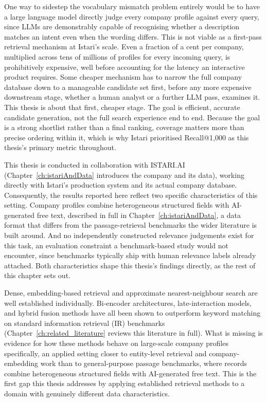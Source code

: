 \documentclass[a4paper,oneside,bibliography=totoc]{scrbook}
\begin{document}
One way to sidestep the vocabulary mismatch problem entirely would be to have a large language model directly judge every company profile against every query, since LLMs are demonstrably capable of recognising whether a description matches an intent even when the wording differs. This is not viable as a first-pass retrieval mechanism at Istari's scale. Even a fraction of a cent per company, multiplied across tens of millions of profiles for every incoming query, is prohibitively expensive, well before accounting for the latency an interactive product requires. Some cheaper mechanism has to narrow the full company database down to a manageable candidate set first, before any more expensive downstream stage, whether a human analyst or a further LLM pass, examines it. This thesis is about that first, cheaper stage. The goal is efficient, accurate candidate generation, not the full search experience end to end. Because the goal is a strong shortlist rather than a final ranking, coverage matters more than precise ordering within it, which is why Istari prioritised Recall@1{,}000 as this thesis's primary metric throughout.

This thesis is conducted in collaboration with ISTARI.AI (Chapter~\ref{ch:istariAndData} introduces the company and its data), working directly with Istari's production system and its actual company database. Consequently, the results reported here reflect two specific characteristics of this setting. Company profiles combine heterogeneous structured fields with AI-generated free text, described in full in Chapter~\ref{ch:istariAndData}, a data format that differs from the passage-retrieval benchmarks the wider literature is built around. And no independently constructed relevance judgements exist for this task, an evaluation constraint a benchmark-based study would not encounter, since benchmarks typically ship with human relevance labels already attached. Both characteristics shape this thesis's findings directly, as the rest of this chapter sets out.

Dense, embedding-based retrieval and approximate nearest-neighbour search are well established individually. Bi-encoder architectures, late-interaction models, and hybrid fusion methods have all been shown to outperform keyword matching on standard information retrieval (IR) benchmarks \citep{karpukhin2020dense} (Chapter~\ref{ch:related_literature} reviews this literature in full). What is missing is evidence for how these methods behave on large-scale company profiles specifically, an applied setting closer to entity-level retrieval and company-embedding work \citep{gerling2023company} than to general-purpose passage benchmarks, where records combine heterogeneous structured fields with AI-generated free text. This is the first gap this thesis addresses by applying established retrieval methods to a domain with genuinely different data characteristics.
\end{document}

